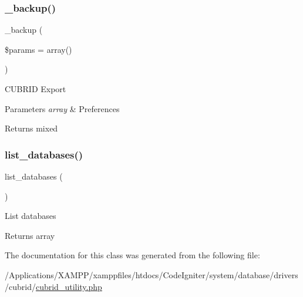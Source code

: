\subsubsection{\texorpdfstring{\+\_\+backup()}{\_backup()}}
{\footnotesize\ttfamily \+\_\+backup (\begin{DoxyParamCaption}\item[{}]{\$params = {\ttfamily array()} }\end{DoxyParamCaption})\hspace{0.3cm}{\ttfamily [protected]}}

C\+U\+B\+R\+ID Export


\begin{DoxyParams}{Parameters}
{\em array} & Preferences \\
\hline
\end{DoxyParams}
\begin{DoxyReturn}{Returns}
mixed 
\end{DoxyReturn}
\mbox{\label{class_c_i___d_b__cubrid__utility_a8486b247a8868504b055622cb2dd34d3}} 
\subsubsection{\texorpdfstring{list\+\_\+databases()}{list\_databases()}}
{\footnotesize\ttfamily list\+\_\+databases (\begin{DoxyParamCaption}{ }\end{DoxyParamCaption})}

List databases

\begin{DoxyReturn}{Returns}
array 
\end{DoxyReturn}


The documentation for this class was generated from the following file\+:\begin{DoxyCompactItemize}
\item 
/\+Applications/\+X\+A\+M\+P\+P/xamppfiles/htdocs/\+Code\+Igniter/system/database/drivers/cubrid/\mbox{\hyperlink{cubrid__utility_8php}{cubrid\+\_\+utility.\+php}}\end{DoxyCompactItemize}
